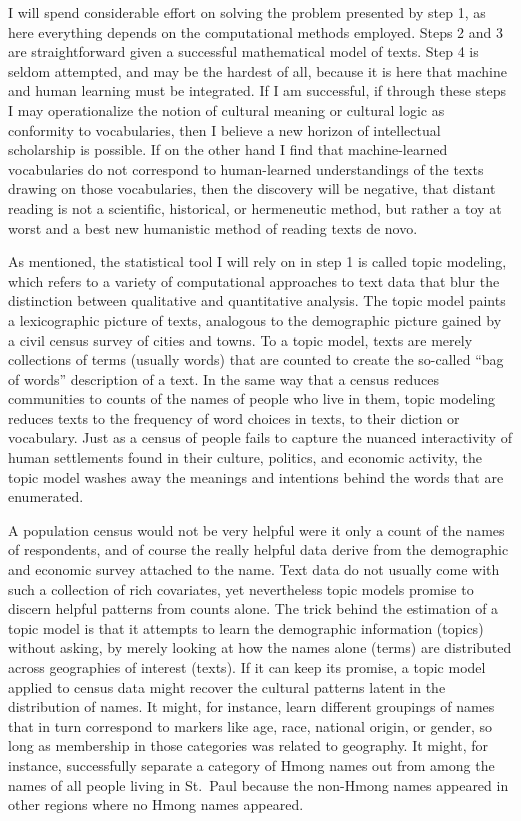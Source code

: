\documentclass[]{book}
\theoremstyle{definition}
\theoremstyle{definition}
\theoremstyle{definition}
\theoremstyle{remark}
\begin{document}
I will spend considerable effort on solving the problem presented by
step 1, as here everything depends on the computational methods
employed. Steps 2 and 3 are straightforward given a successful
mathematical model of texts. Step 4 is seldom attempted, and may be the
hardest of all, because it is here that machine and human learning must
be integrated. If I am successful, if through these steps I may
operationalize the notion of cultural meaning or cultural logic as
conformity to vocabularies, then I believe a new horizon of intellectual
scholarship is possible. If on the other hand I find that
machine-learned vocabularies do not correspond to human-learned
understandings of the texts drawing on those vocabularies, then the
discovery will be negative, that distant reading is not a scientific,
historical, or hermeneutic method, but rather a toy at worst and a best
new humanistic method of reading texts de novo.

As mentioned, the statistical tool I will rely on in step 1 is called
topic modeling, which refers to a variety of computational approaches to
text data that blur the distinction between qualitative and quantitative
analysis. The topic model paints a lexicographic picture of texts,
analogous to the demographic picture gained by a civil census survey of
cities and towns. To a topic model, texts are merely collections of
terms (usually words) that are counted to create the so-called ``bag of
words'' description of a text. In the same way that a census reduces
communities to counts of the names of people who live in them, topic
modeling reduces texts to the frequency of word choices in texts, to
their diction or vocabulary. Just as a census of people fails to capture
the nuanced interactivity of human settlements found in their culture,
politics, and economic activity, the topic model washes away the
meanings and intentions behind the words that are enumerated.

A population census would not be very helpful were it only a count of
the names of respondents, and of course the really helpful data derive
from the demographic and economic survey attached to the name. Text data
do not usually come with such a collection of rich covariates, yet
nevertheless topic models promise to discern helpful patterns from
counts alone. The trick behind the estimation of a topic model is that
it attempts to learn the demographic information (topics) without
asking, by merely looking at how the names alone (terms) are distributed
across geographies of interest (texts). If it can keep its promise, a
topic model applied to census data might recover the cultural patterns
latent in the distribution of names. It might, for instance, learn
different groupings of names that in turn correspond to markers like
age, race, national origin, or gender, so long as membership in those
categories was related to geography. It might, for instance,
successfully separate a category of Hmong names out from among the names
of all people living in St.~Paul because the non-Hmong names appeared in
other regions where no Hmong names appeared.
\end{document}
